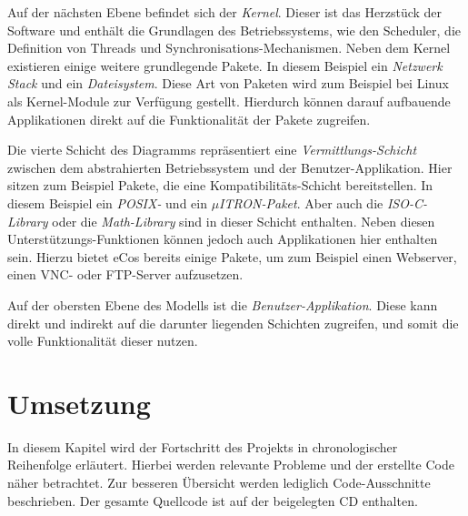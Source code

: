 \documentclass[
  a4paper,					%
  twoside,
  DIV=calc,     				%
  bibliography=totoc,
  cleardoublepage=empty,
  ngerman,     					%
  final       					%
]{scrbook}
\begin{document}
Auf der nächsten Ebene befindet sich der \emph{Kernel}. Dieser ist das Herzstück der Software und enthält die Grundlagen des Betriebssystems, wie den Scheduler, die Definition von Threads und Synchronisations-Mechanismen. Neben dem Kernel existieren einige weitere grundlegende Pakete. In diesem Beispiel ein \emph{Netzwerk Stack} und ein \emph{Dateisystem}. Diese Art von Paketen wird zum Beispiel bei Linux als Kernel-Module zur Verfügung gestellt. Hierdurch können darauf aufbauende Applikationen direkt auf die Funktionalität der Pakete zugreifen.

Die vierte Schicht des Diagramms repräsentiert eine \emph{Vermittlungs-Schicht} zwischen dem abstrahierten Betriebssystem und der Benutzer-Applikation. Hier sitzen zum Beispiel Pakete, die eine Kompatibilitäts-Schicht bereitstellen. In diesem Beispiel ein \emph{POSIX-} und ein \emph{$\mu$ITRON-Paket}. Aber auch die \emph{ISO-C-Library} oder die \emph{Math-Library} sind in dieser Schicht enthalten. Neben diesen Unterstützungs-Funktionen können jedoch auch Applikationen hier enthalten sein. Hierzu bietet eCos bereits einige Pakete, um zum Beispiel einen Webserver, einen VNC- oder FTP-Server aufzusetzen.

Auf der obersten Ebene des Modells ist die \emph{Benutzer-Applikation}. Diese kann direkt und indirekt auf die darunter liegenden Schichten zugreifen, und somit die volle Funktionalität dieser nutzen.






























\chapter{Umsetzung}
\label{sec:Umsetzung}
In diesem Kapitel wird der Fortschritt des Projekts in chronologischer Reihenfolge erläutert. Hierbei werden relevante Probleme und der erstellte Code näher betrachtet. Zur besseren Übersicht werden lediglich Code-Ausschnitte beschrieben. Der gesamte Quellcode ist auf der beigelegten CD enthalten.
\end{document}
